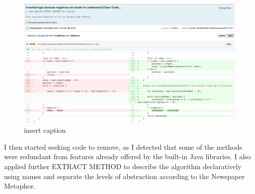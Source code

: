 \begin{figure}[H]
	\centering
	\includegraphics[width=\linewidth]{code33}
	\caption{insert caption}
\end{figure}

I then started seeking code to remove, as I detected that some of the methods were redundant from features already offered by the built-in Java libraries. I also applied further EXTRACT METHOD to describe the algorithm declaratively using names and separate the levels of abstraction according to the Newspaper Metaphor.

